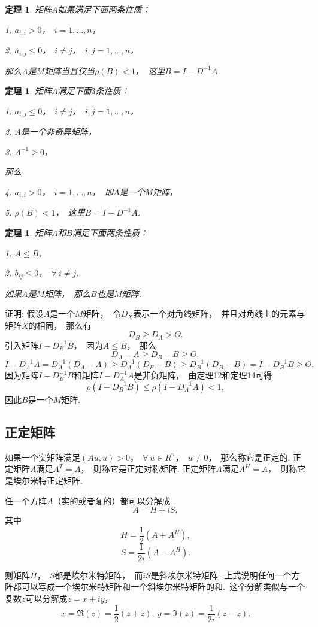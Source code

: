\documentclass{article}
\begin{document}
\newtheorem{thm}{定理}
\begin{thm}
矩阵$A$如果满足下面两条性质：

1. $a_{i,i}>0$，~$i=1,\ldots ,n$，

2. $a_{i,j}\le 0$，~$i\neq j$，~$i,j=1,\ldots ,n$，

那么$A$是$M$矩阵当且仅当$\rho (B)<1$，~这里$B=I-D^{-1}A$.
\end{thm}

\newtheorem{thm}{定理}
\begin{thm}
矩阵$A$满足下面$3$条性质：

1. $a_{i,j}\le 0$，~$i\neq j$，~$i,j=1,\ldots ,n$，

2. $A$是一个非奇异矩阵，

3. $A^{-1}\ge 0$，

那么

4. $a_{i,i}>0$，~$i=1,\ldots ,n$，~即$A$是一个$M$矩阵，

5. $\rho (B)<1$，~这里$B=I-D^{-1}A$.
\end{thm}

\newtheorem{thm}{定理}
\begin{thm}
矩阵$A$和$B$满足下面两条性质：

1. $A\le B$，

2. $b_{ij}\le 0$，~$\forall ~i\neq j$.

如果$A$是$M$矩阵，~那么$B$也是$M$矩阵.
\end{thm}
证明:
假设$A$是一个$M$矩阵，~令$D_X$表示一个对角线矩阵，~并且对角线上的元素与矩阵$X$的相同，~那么有
$$D_B\ge D_A>O.$$
引入矩阵$I-D_B^{-1}B$，~因为$A\le B$，~那么
$$D_A-A\ge D_B-B\ge O,$$
$$I-D^{-1}_AA=D^{-1}_A(D_A-A)\ge D^{-1}_A(D_B-B)\ge D^{-1}_B(D_B-B)=I-D^{-1}_BB\ge O.$$
因为矩阵$I-D^{-1}_BB$和矩阵$I-D^{-1}_AA$是非负矩阵，~由定理12和定理14可得
$$\rho (I-D^{-1}_BB)\le\rho (I-D^{-1}_AA)<1,$$
因此$B$是一个$M$矩阵.

\subsection{正定矩阵}
如果一个实矩阵满足$(Au,u)>0$，~$\forall~u\in  R^n$，~$u\neq 0$，~那么称它是正定的.
正定矩阵$A$满足$A^T=A$，~则称它是正定对称矩阵.
正定矩阵$A$满足$A^H=A$，~则称它是埃尔米特正定矩阵.

任一个方阵$A$（实的或者复的）都可以分解成
$$A=H+iS,$$
其中
$$H=\frac{1}{2}(A+A^H),$$
$$S=\frac{1}{2i}(A-A^H).$$

则矩阵$H$，~$S$都是埃尔米特矩阵，~而$iS$是斜埃尔米特矩阵.~上式说明任何一个方阵都可以写成一个埃尔米特矩阵和一个斜埃尔米特矩阵的和.~这个分解类似与一个复数$z$可以分解成$z=x+iy$，
$$x=\Re (z)=\frac{1}{2}(z+\bar{z}),~y=\Im (z)=\frac{1}{2i}(z-\bar{z}).$$
\end{document}
